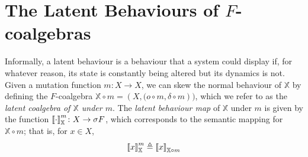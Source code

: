 \section{The Latent Behaviours of $F$-coalgebras}
Informally, a latent behaviour is a behaviour that a system could display if, for whatever reason, its state is constantly being altered but its dynamics is not. 
Given a mutation function $m\colon X\rightarrow X$, we can skew the normal behaviour of $\mathbb{X}$ by defining the $F$-coalgebra $\mathbb{X}\circ m=(X,{(o\circ m, \delta\circ m }))$, which we refer to as the \emph{latent coalgebra of $\mathbb{X}$ under $m$}. The \emph{latent behaviour map} of $\mathbb{X}$ under $m$ is given by the function ${{\llbracket\cdot\rrbracket}}^{m}_{\mathbb{X}}\colon X\rightarrow \sigma F$, which corresponds to the semantic mapping for $\mathbb{X}\circ m$; that is, for $x\in X$, 
\begin{align}
{{\llbracket x\rrbracket}}^{m}_{\mathbb{X}}\triangleq{{\llbracket x\rrbracket}}_{{\mathbb{X}\circ m}}
\end{align}

